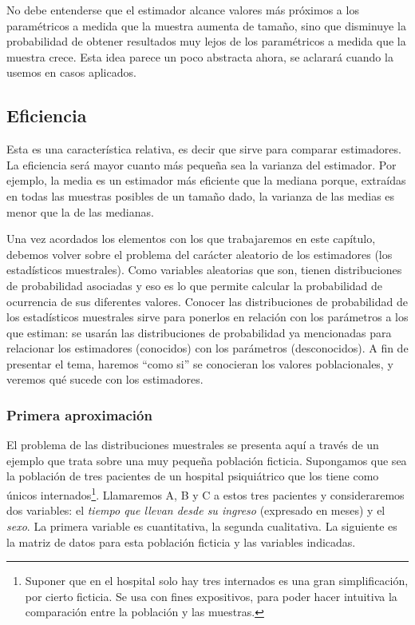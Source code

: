 \documentclass[]{book}
\let\rmarkdownfootnote\footnote%
\def\footnote{\protect\rmarkdownfootnote}
\begin{document}
No debe entenderse que el estimador alcance valores más próximos a los
paramétricos a medida que la muestra aumenta de tamaño, sino que
disminuye la probabilidad de obtener resultados muy lejos de los
paramétricos a medida que la muestra crece. Esta idea parece un poco
abstracta ahora, se aclarará cuando la usemos en casos aplicados.

\hypertarget{eficiencia}{%
\subsection{Eficiencia}\label{eficiencia}}

Esta es una característica relativa, es decir que sirve para comparar
estimadores. La eficiencia será mayor cuanto más pequeña sea la varianza
del estimador. Por ejemplo, la media es un estimador más eficiente que
la mediana porque, extraídas en todas las muestras posibles de un tamaño
dado, la varianza de las medias es menor que la de las medianas.

Una vez acordados los elementos con los que trabajaremos en este
capítulo, debemos volver sobre el problema del carácter aleatorio de los
estimadores (los estadísticos muestrales). Como variables aleatorias que
son, tienen distribuciones de probabilidad asociadas y eso es lo que
permite calcular la probabilidad de ocurrencia de sus diferentes
valores. Conocer las distribuciones de probabilidad de los estadísticos
muestrales sirve para ponerlos en relación con los parámetros a los que
estiman: se usarán las distribuciones de probabilidad ya mencionadas
para relacionar los estimadores (conocidos) con los parámetros
(desconocidos). A fin de presentar el tema, haremos ``como si'' se
conocieran los valores poblacionales, y veremos qué sucede con los
estimadores.

\hypertarget{primera-aproximaciuxf3n}{%
\subsubsection{Primera aproximación}\label{primera-aproximaciuxf3n}}

El problema de las distribuciones muestrales se presenta aquí a través
de un ejemplo que trata sobre una muy pequeña población ficticia.
Supongamos que sea la población de tres pacientes de un hospital
psiquiátrico que los tiene como únicos internados\footnote{Suponer que en el hospital solo hay tres internados es una gran simplificación, por cierto ficticia. Se usa con fines expositivos, para poder hacer intuitiva la comparación entre la población y las muestras.}. Llamaremos A, B
y C a estos tres pacientes y consideraremos dos variables: el \emph{tiempo que llevan desde su ingreso} (expresado en meses) y el \emph{sexo}. La
primera variable es cuantitativa, la segunda cualitativa. La siguiente
es la matriz de datos para esta población ficticia y las variables
indicadas.
\end{document}
